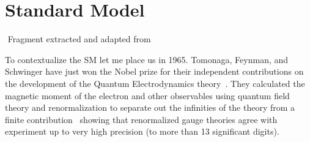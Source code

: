\section{Standard Model}

{$ $ \scriptsize \hfill Fragment extracted and adapted from~\parencite{robinson2011symmetry}}

To contextualize the SM let me place us in 1965. Tomonaga, Feynman, and Schwinger have just won the Nobel prize for their independent contributions on the development of the Quantum Electrodynamics theory~\parencite{1972physics}. They calculated the magnetic moment of the electron and other observables using quantum field theory and renormalization to separate out the infinities of the theory from a finite contribution~\parencite{PhysRev.75.486} showing that renormalized gauge theories agree with experiment up to very high precision (to more than 13 significant digits)\parencite{1674-1137-40-10-100001}.

